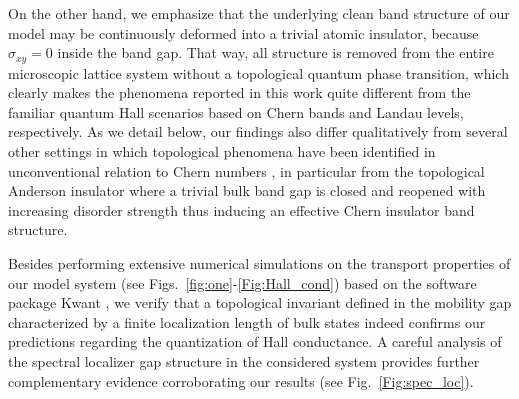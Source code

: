 \documentclass[aps,prl,amsmath,amssymb,twocolumn, superscriptaddress]{revtex4-2}
\begin{document}
On the other hand, we emphasize that the underlying clean band structure of our model may be continuously deformed into a trivial atomic insulator, because $\sigma_{xy} = 0$ inside the band gap. That way, all structure is removed from the entire microscopic lattice system without a topological quantum phase transition, which clearly makes the phenomena reported in this work quite different from the familiar quantum Hall scenarios based on Chern bands and Landau levels, respectively. As we detail below, our findings also differ qualitatively from several other settings in which topological phenomena have been identified in unconventional relation to Chern numbers \cite{Anomalous_BBC, Anomalous_Floquet_AI, Floquet_levitation, Fine_structure}, in particular from the topological Anderson insulator \cite{TAI, theory_TAI, Mobility_gap_TAI, Disordered_CI_HHH} where a trivial bulk band gap is closed and reopened with increasing disorder strength thus inducing an effective Chern insulator band structure.

Besides performing extensive numerical simulations on the transport properties of our model system (see Figs.~\ref{fig:one}-\ref{Fig:Hall_cond}) based on the software package Kwant \cite{Kwant, Kwant_Mumps, KPM_tools}, we verify that a topological invariant defined in the mobility gap \cite{Smatrix_pumping, Smatrix_pumping_2, Scattering_invariants} characterized by a finite localization length of bulk states indeed confirms our predictions regarding the quantization of Hall conductance. A careful analysis of the spectral localizer gap structure \cite{Spec_loc_1, Spec_loc_2, Spec_loc_3, Spec_loc_4, Spec_loc_5, spec_loc_mobility_gap} in the considered system provides further complementary evidence corroborating our results (see Fig.~\ref{Fig:spec_loc}).  
\end{document}
